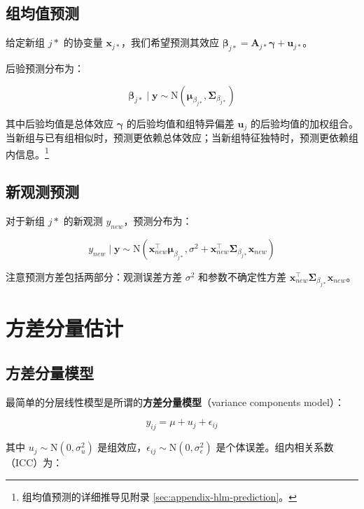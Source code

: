 \subsection{组均值预测}
\label{sec:group-mean-prediction}

给定新组 $j*$ 的协变量 $\mathbf{x}_{j*}$，我们希望预测其效应 $\boldsymbol{\beta}_{j*} = \mathbf{A}_{j*}\boldsymbol{\gamma} + \mathbf{u}_{j*}$。

后验预测分布为：

\[
\boldsymbol{\beta}_{j*} \mid \mathbf{y} \sim \mathrm{N}(\boldsymbol{\mu}_{\beta_{j*}}, \boldsymbol{\Sigma}_{\beta_{j*}})
\]

其中后验均值是总体效应 $\boldsymbol{\gamma}$ 的后验均值和组特异偏差 $\mathbf{u}_j$ 的后验均值的加权组合。当新组与已有组相似时，预测更依赖总体效应；当新组特征独特时，预测更依赖组内信息。\footnote{组均值预测的详细推导见附录 \cref{sec:appendix-hlm-prediction}。}

\subsection{新观测预测}
\label{sec:new-observation-prediction}

对于新组 $j*$ 的新观测 $y_{new}$，预测分布为：

\[
y_{new} \mid \mathbf{y} \sim \mathrm{N}\left(\mathbf{x}_{new}^\top \boldsymbol{\mu}_{\beta_{j*}}, \sigma^2 + \mathbf{x}_{new}^\top \boldsymbol{\Sigma}_{\beta_{j*}} \mathbf{x}_{new}\right)
\]

注意预测方差包括两部分：观测误差方差 $\sigma^2$ 和参数不确定性方差 $\mathbf{x}_{new}^\top \boldsymbol{\Sigma}_{\beta_{j*}} \mathbf{x}_{new}$。

\section{方差分量估计}
\label{sec:variance-components}

\subsection{方差分量模型}
\label{sec:variance-component-model}

最简单的分层线性模型是所谓的\textbf{方差分量模型}（variance components model）：

\[
y_{ij} = \mu + u_j + \epsilon_{ij}
\]

其中 $u_j \sim \mathrm{N}(0, \sigma_u^2)$ 是组效应，$\epsilon_{ij} \sim \mathrm{N}(0, \sigma_\epsilon^2)$ 是个体误差。组内相关系数（ICC）为：

